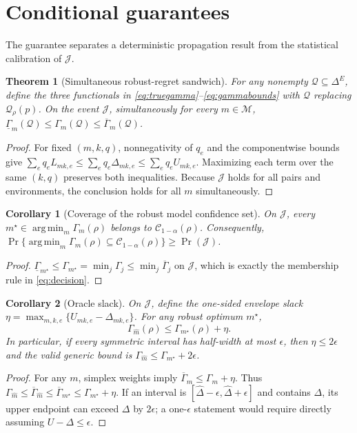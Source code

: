 \documentclass{article}
\newtheorem{theorem}{Theorem}
\newtheorem{corollary}{Corollary}
\DeclareMathOperator*{\argmin}{arg\,min}
\newcommand{\M}{\mathcal{M}}
\newcommand{\Q}{\mathcal{Q}}
\newcommand{\RRlo}{\underline{\Gamma}}
\newcommand{\RRhi}{\overline{\Gamma}}
\begin{document}
\section{Conditional guarantees}
\label{sec:theory}

The guarantee separates a deterministic propagation result from the statistical calibration of $\mathcal J$.

\begin{theorem}[Simultaneous robust-regret sandwich]
\label{thm:sandwich}
For any nonempty $\Q\subseteq\Delta^E$, define the three functionals in \eqref{eq:truegamma}--\eqref{eq:gammabounds} with $\Q$ replacing $\Q_\rho(p)$.  On the event $\mathcal J$, simultaneously for every $m\in\M$,
$\RRlo_m(\Q)\leq\Gamma_m(\Q)\leq\RRhi_m(\Q)$.
\end{theorem}
\begin{proof}
For fixed $(m,k,q)$, nonnegativity of $q_e$ and the componentwise bounds give
$\sum_eq_eL_{mk,e}\leq\sum_eq_e\Delta_{mk,e}\leq\sum_eq_eU_{mk,e}$.
Maximizing each term over the same $(k,q)$ preserves both inequalities.  Because $\mathcal J$ holds for all pairs and environments, the conclusion holds for all $m$ simultaneously.
\end{proof}

\begin{corollary}[Coverage of the robust model confidence set]
\label{cor:mcs}
On $\mathcal J$, every $m^\star\in\argmin_m\Gamma_m(\rho)$ belongs to $\mathcal C_{1-\alpha}(\rho)$.  Consequently, $\Pr\{\argmin_m\Gamma_m(\rho)\subseteq\mathcal C_{1-\alpha}(\rho)\}\geq\Pr(\mathcal J)$.
\end{corollary}
\begin{proof}
$\RRlo_{m^\star}\leq\Gamma_{m^\star}=\min_j\Gamma_j\leq\min_j\RRhi_j$ on $\mathcal J$, which is exactly the membership rule in \eqref{eq:decision}.
\end{proof}

\begin{corollary}[Oracle slack]
\label{prop:oracle}
On $\mathcal J$, define the one-sided envelope slack
$\eta=\max_{m,k,e}\{U_{mk,e}-\Delta_{mk,e}\}$.  For any robust optimum $m^\star$,
\begin{equation}
\Gamma_{\widehat m}(\rho)\leq\Gamma_{m^\star}(\rho)+\eta.
\label{eq:oracle}
\end{equation}
In particular, if every symmetric interval has half-width at most $\epsilon$, then $\eta\leq2\epsilon$ and the valid generic bound is $\Gamma_{\widehat m}\leq\Gamma_{m^\star}+2\epsilon$.
\end{corollary}
\begin{proof}
For any $m$, simplex weights imply $\RRhi_m\leq\Gamma_m+\eta$.  Thus
$\Gamma_{\widehat m}\leq\RRhi_{\widehat m}\leq\RRhi_{m^\star}
\leq\Gamma_{m^\star}+\eta$.  If an interval is $[\widehat\Delta-\epsilon,\widehat\Delta+\epsilon]$ and contains $\Delta$, its upper endpoint can exceed $\Delta$ by $2\epsilon$; a one-$\epsilon$ statement would require directly assuming $U-\Delta\leq\epsilon$.
\end{proof}
\end{document}

